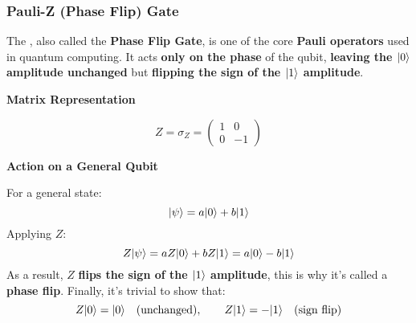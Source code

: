 \subsubsection{Pauli-Z (Phase Flip) Gate}\label{subsubsection: Pauli-Z (Phase Flip) Gate}

The , also called the \textbf{Phase Flip Gate}, is one of the core \textbf{Pauli operators} used in quantum computing. It acts \textbf{only on the phase} of the qubit, \textbf{leaving the $| 0 \rangle$ amplitude unchanged} but \textbf{flipping the sign of the $| 1 \rangle$ amplitude}.

\highspace
\begin{flushleft}
    \textcolor{Green3}{ \textbf{Matrix Representation}}
\end{flushleft}
\begin{equation}
    Z = \sigma_{Z} = 
    \begin{pmatrix}
        1 & 0 \\
        0 & -1
    \end{pmatrix}
\end{equation}

\highspace
\begin{flushleft}
    \textcolor{Green3}{ \textbf{Action on a General Qubit}}
\end{flushleft}
For a general state:
\begin{equation*}
    | \psi \rangle = a| 0 \rangle + b| 1 \rangle
\end{equation*}
Applying $Z$:
\begin{equation*}
    Z| \psi \rangle = aZ| 0 \rangle + bZ| 1 \rangle = a| 0 \rangle - b| 1 \rangle
\end{equation*}
As a result, $Z$ \textbf{flips the sign of the $| 1 \rangle$ amplitude}, this is why it's called a \textbf{phase flip}. Finally, it's trivial to show that:
\begin{equation*}
    Z| 0 \rangle = | 0 \rangle \hspace{1em} \text{(unchanged)}, \hspace{2em} Z| 1 \rangle = -| 1 \rangle \hspace{1em} \text{(sign flip)}
\end{equation*}

